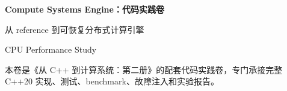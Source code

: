 \begin{titlepage}
\thispagestyle{empty}
\vspace*{2.2cm}
{\Huge\bfseries\color{BookNavy} Compute Systems Engine：代码实践卷\par}
\vspace{0.68cm}
{\Large\color{BookAccent} 从 reference 到可恢复分布式计算引擎\par}
\vspace{1.25cm}
{\large CPU Performance Study\par}
\vfill
{\small\color{BookMuted} 本卷是《从 C++ 到计算系统：第二册》的配套代码实践卷，专门承接完整 C++20 实现、测试、benchmark、故障注入和实验报告。\par}
\end{titlepage}
